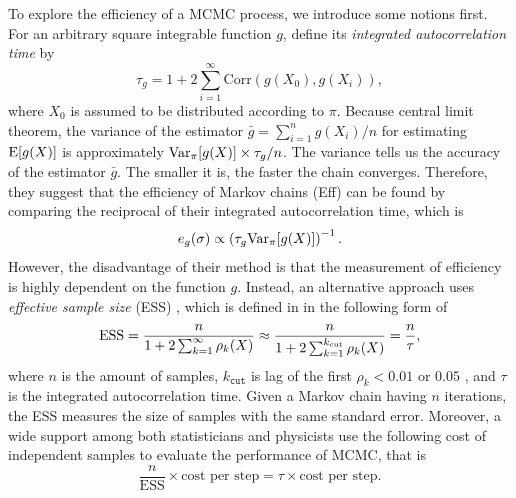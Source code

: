 To explore the efficiency of a MCMC process, we introduce some notions first. For an arbitrary square integrable function $g$, \cite{roberts2001optimal} define its \textit{integrated autocorrelation time} by 
\begin{equation*}
\tau_g = 1+ 2\sum_{i=1}^{\infty} \mathrm{Corr}\left( g(X_0),g(X_i) \right),
\end{equation*}
where $X_0$ is assumed to be distributed according to $\pi$. Because central limit theorem, the variance of the estimator $\bar{g} = \sum_{i=1}^{n}g(X_i)/n$ for estimating $\mathrm{E}\lbrack g(X) \rbrack$ is approximately $\mathrm{Var}_\pi\lbrack g(X)\rbrack \times \tau_g/n$. The variance tells us the accuracy of the estimator $\bar{g}$. The smaller it is, the faster the chain converges. Therefore, they suggest that the efficiency of Markov chains (Eff) can be found by comparing the reciprocal of their integrated autocorrelation time, which is 
\begin{equation*}
e_g(\sigma)\propto \left(\tau_g\mathrm{Var}_\pi\lbrack g(X)\rbrack \right)^{-1}. 
\end{equation*}
However, the disadvantage of their method is that the measurement of efficiency is highly dependent on the function $g$. Instead, an alternative approach uses \textit{effective sample size} (ESS) \citep{kass1998markov, robert2004monte},  which is defined in \citep{gong2016practical} in the following form of  
\begin{equation*}
\mbox{ESS} =  \frac{n}{1+2\sum_{k=1}^{\infty}\rho_k(X)} \approx \frac{n}{1+2\sum_{k=1}^{k_\text{\tiny cut}}\rho_k(X)}= \frac{n}{\tau}, 
\end{equation*}
where $n$ is the amount of samples, $k_\mathtt{cut}$ is lag of the first $\rho_k<0.01$  or $0.05$ , and $\tau$ is the integrated autocorrelation time. Given a Markov chain having $n$ iterations, the ESS measures the size of \iid samples with the same standard error. Moreover, a wide support among both statisticians \citep{geyer1992practical} and physicists \citep{sokal1997monte} use the following cost of independent samples to evaluate the performance of MCMC, that is 
\begin{equation*}
\frac{n}{\mbox{ESS}}\times \mbox{cost per step} = \tau \times  \mbox{cost per step}.
\end{equation*} 

